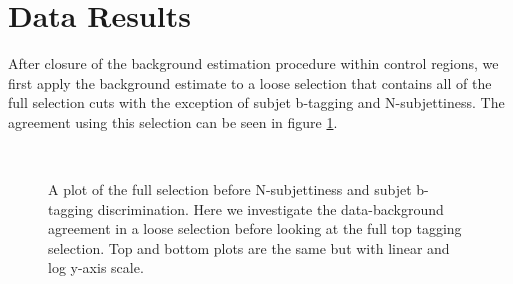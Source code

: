 \section{Data Results}
After closure of the background estimation procedure within control regions, 
we first apply the background estimate to a loose selection that contains all of the full selection cuts with the exception of subjet 
b-tagging and N-subjettiness.  The agreement using this selection can be seen in figure \ref{figs:CMSTTonlyMtbvsBkg1}.

\begin{figure}[htcb]
\begin{center}
\\
\caption{
A plot of the full selection before N-subjettiness and subjet b-tagging discrimination.   
Here we investigate the data-background agreement in a loose selection before looking at the full top tagging selection.  Top and bottom plots are the same but with linear and log y-axis scale.}
\label{figs:CMSTTonlyMtbvsBkg1}
\end{center}
\end{figure}

